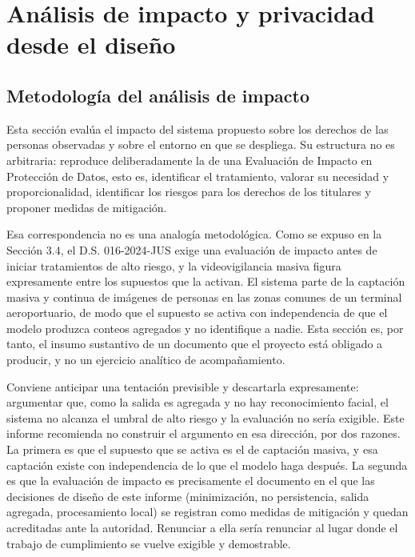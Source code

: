 %
%

\section{Análisis de impacto y privacidad desde el diseño}
\label{sec:analisis}

\subsection{Metodología del análisis de impacto}
\label{sec:eipd}

Esta sección evalúa el impacto del sistema propuesto sobre los derechos
de las personas observadas y sobre el entorno en que se despliega. Su
estructura no es arbitraria: reproduce deliberadamente la de una
Evaluación de Impacto en Protección de Datos, esto es, identificar el
tratamiento, valorar su necesidad y proporcionalidad, identificar los
riesgos para los derechos de los titulares y proponer medidas de
mitigación.

Esa correspondencia no es una analogía metodológica. Como se expuso en
la Sección 3.4, el D.S. 016-2024-JUS exige una evaluación de impacto
antes de iniciar tratamientos de alto riesgo, y la videovigilancia
masiva figura expresamente entre los supuestos que la activan. El
sistema parte de la captación masiva y continua de imágenes de personas
en las zonas comunes de un terminal aeroportuario, de modo que el
supuesto se activa con independencia de que el modelo produzca conteos
agregados y no identifique a nadie. Esta sección es, por tanto, el
insumo sustantivo de un documento que el proyecto está obligado a
producir, y no un ejercicio analítico de acompañamiento.

Conviene anticipar una tentación previsible y descartarla expresamente:
argumentar que, como la salida es agregada y no hay reconocimiento
facial, el sistema no alcanza el umbral de alto riesgo y la evaluación
no sería exigible. Este informe recomienda no construir el argumento en
esa dirección, por dos razones. La primera es que el supuesto que se
activa es el de captación masiva, y esa captación existe con
independencia de lo que el modelo haga después. La segunda es que la
evaluación de impacto es precisamente el documento en el que las
decisiones de diseño de este informe (minimización, no persistencia,
salida agregada, procesamiento local) se registran como medidas de
mitigación y quedan acreditadas ante la autoridad. Renunciar a ella
sería renunciar al lugar donde el trabajo de cumplimiento se vuelve
exigible y demostrable.


